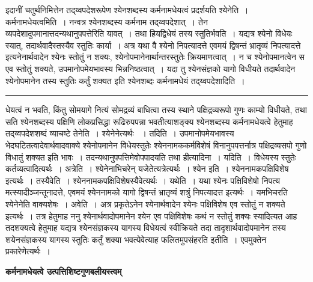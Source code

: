 \documentclass[11pt, openany]{book}
\makeatletter
\def\blfootnote{\gdef\@thefnmark{}\@footnotetext}
\makeatother
\begin{document}
 इदानीं चतुर्थनिमित्तेन तद्य्वपदेशरूपेण श्येनशब्दस्य कर्मनामधेयत्वं प्रदर्शयति {\br श्येनेति~। कर्मनामधेयत्वमिति~।} नन्वत्र श्येनशब्दस्य कर्मनाम
\blfootnote{पाठा०\textemdash\ $^{१}$ततः परम्. }
\newpage
\fancyhead[RE]{[ तद्य्वपदे०कर्म०धेयत्वम् ]}
{\bl\noindent 
तद्य्वपदेशात्~। तेन व्यपदेशादुपमानात्तदन्यथानुपपत्तेरिति यावत्~। तथा हि\textendash यद्विधेयं तस्य स्तुतिर्भवति~। यद्यत्र श्येनो विधेयः स्यात्, तदार्थवादैस्तस्यैव स्तुतिः कार्या~। अत्र {\qtl यथा वै श्येनो निपत्यादत्ते एवमयं द्विषन्तं भ्रातृव्यं निपत्यादत्ते} इत्यनेनार्थवादेन श्येनः स्तोतुं न शक्यः, श्येनोपमानेनार्थान्तरस्तुतेः  क्रियमाणत्वात्~। न च श्येनोपमानत्वेन स एव स्तोतुं शक्यते,  उपमानोपमेयभावस्य भिन्ननिष्ठत्वात्~। यदा तु श्येनसंज्ञको यागो  विधीयते तदार्थवादेन श्येनोपमानेन तस्य स्तुतिः कर्तुं शक्यत
इति श्येनशब्दः कर्मनामधेयं तद्य्वपदेशादिति~।~}\\
\hrule
\vspace{3mm}
\noindent
धेयत्वं न भवति, किंतु सोमयागे नित्यं सोमद्रव्यं बाधित्वा तस्य स्थाने पक्षिद्रव्यरूपो गुणः काम्यो विधीयते, तथा सति श्येनशब्दस्य पक्षिणि लोकप्रसिद्धा 
रूढिरुपपन्ना भवतीत्याशङ्क्य श्येनशब्दस्य कर्मनामधेयत्वे हेतुमाह तद्य्वपदेशशब्दं व्याचष्टे {\br तेनेति~।} श्येनेनेत्यर्थः
~। {\br तदिति~।}  उपमानोपमेयभावस्य भेदघटितत्वादेवार्थवादवाक्ये श्येनोपमानेन विधेयस्तुतेः श्येननामककर्मविशेषं विनानुपपत्तर्नात्र पक्षिद्रव्यसपो गुणो विधातुं
शक्यत इति भावः~। तदन्यथानुपपत्तिमेवोपपादयति {\br तथा हीत्यादिना~। यदिति~।}  विधेयस्य स्तुतेः कर्तव्यत्वादित्यर्थः~। {\br अत्रेति~।} श्येनेनाभिचरेन्
यजेतेत्यत्रेत्यर्थः~। {\br श्येन इति~।} श्येननामकपक्षिविशेष इत्यर्थः~। {\br तस्यैवेति~।} श्येननामकपक्षिविशेषस्यैवेत्यर्थः~। {\br यथेति~।} यथा श्येनः पक्षिविशेषो निपत्य
मत्स्यादीञ्जन्तूनादत्ते, एवमयं श्येननामको यागो द्विषन्तं भ्रातृव्यं शत्रुं निपत्यादत्त इत्यर्थः~। यमभिचरति श्येनेनेति वाक्यशेषः~। {\br अवेति~।} अत्र प्रकृतेऽनेन
श्येनार्थवादेन  श्येनः पक्षिविशेष एव स्तोतुं न शक्यते इत्यर्थः~। तत्र हेतुमाह ननु श्येनार्थवादोपमानेन श्येन एव पक्षिविशेषः कथं न स्तोतुं शक्यः
स्यादित्यत आह तदशक्यत्वे हेतुमाह यद्यत्र श्येनसंज्ञकस्य यागस्य विधेयत्वं स्वीक्रियते तदा
तादृशार्थवादोपमानेन तस्य शयेनसंज्ञकस्य यागस्य स्तुतिः कर्तुं शक्या भवत्येवेत्याह फलितमुपसंहरति {\br इतीति~।} एवमुक्तेन प्रकारेणेत्यर्थः~।
\newpage
\fancyhead[LO]{[ कर्म०उत्प०गुण० ]}
\begin{center}
 \textbf{कर्मनामधेयत्वे उत्पत्तिशिष्टगुणबलीयस्त्वम् }   
\end{center}
 
\end{document}
